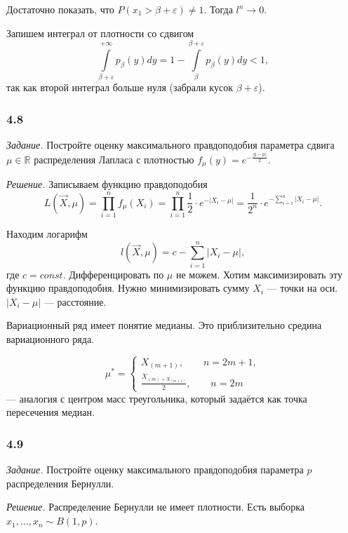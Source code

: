 Достаточно показать, что $P \left( x_1 > \beta + \varepsilon \right) \neq 1$.
Тогда $l^n \to 0$.

Запишем интеграл от плотности со сдвигом
$$ \int \limits_{ \beta + \varepsilon }^{+ \infty } p_{ \beta } \left( y \right) dy =
  1 - \int \limits_{ \beta }^{ \beta + \varepsilon } p_{ \beta } \left( y \right) dy <
  1,$$
так как второй интеграл больше нуля (забрали кусок $ \beta + \varepsilon $).

\subsubsection*{4.8}

\textit{Задание.}
Постройте оценку максимального правдоподобия параметра сдвига $ \mu \in \mathbb{R}$
распределения Лапласа с плотностью
$f_{ \mu } \left( y \right) =
  e^{- \frac{ \left| y - \mu \right| }{2}}$.

\textit{Решение.} Записываем функцию правдоподобия
$$L \left( \vec{X}, \mu \right) =
  \prod \limits_{i = 1}^n f_{ \mu } \left( X_i \right) =
  \prod \limits_{i = 1}^n \frac{1}{2} \cdot e^{- \left| X_i - \mu \right| } =
  \frac{1}{2^n} \cdot e^{- \sum \limits_{i = 1}^n \left| X_i - \mu \right| }.$$

Находим  логарифм
$$l \left( \vec{X}, \mu \right) =
  c - \sum \limits_{i = 1}^n \left| X_i - \mu \right|,$$
где $c = const$.
Дифференцировать по $ \mu $ не можем.
Хотим максимизировать эту функцию правдоподобия.
Нужно минимизировать сумму $X_i$ --- точки на оси.
$ \left| X_i - \mu \right| $ --- расстояние.

Вариационный ряд имеет понятие медианы.
Это приблизительно средина вариационного ряда.

$$ \mu^* =
  \begin{cases}
    X_{ \left( m + 1 \right) }, \qquad n = 2m + 1, \\
    \frac{X_{ \left( m \right) + X_{ \left( m + 1 \right) }}}{2}, \qquad n = 2m
  \end{cases}$$
--- аналогия с центром масс треугольника, который задаётся как точка пересечения медиан.

\subsubsection*{4.9}

\textit{Задание.} Постройте оценку максимального правдоподобия параметра $p$ распределения Бернулли.

\textit{Решение.} Распределение Бернулли не имеет плотности.
Есть выборка $x_1, \dotsc, x_n \sim B \left( 1, p \right) $.

